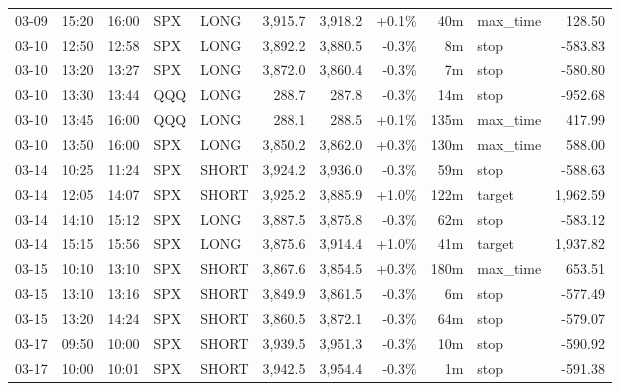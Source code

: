 \documentclass[11pt,a4paper,twoside]{article}
\begin{document}
\begin{center}
\begin{longtable}{>{\color{txtmain}}l l l l l r r r r >{\color{txtmain}}l r}
03-09 & 15:20 & 16:00 & SPX & LONG & 3,915.7 & 3,918.2 & \textcolor{wingreen}{+0.1\%} & 40m & max\_time & \textcolor{wingreen}{128.50} \\
03-10 & 12:50 & 12:58 & SPX & LONG & 3,892.2 & 3,880.5 & \textcolor{lossred}{-0.3\%} & 8m & stop & \textcolor{lossred}{-583.83} \\
03-10 & 13:20 & 13:27 & SPX & LONG & 3,872.0 & 3,860.4 & \textcolor{lossred}{-0.3\%} & 7m & stop & \textcolor{lossred}{-580.80} \\
03-10 & 13:30 & 13:44 & QQQ & LONG & 288.7 & 287.8 & \textcolor{lossred}{-0.3\%} & 14m & stop & \textcolor{lossred}{-952.68} \\
03-10 & 13:45 & 16:00 & QQQ & LONG & 288.1 & 288.5 & \textcolor{wingreen}{+0.1\%} & 135m & max\_time & \textcolor{wingreen}{417.99} \\
03-10 & 13:50 & 16:00 & SPX & LONG & 3,850.2 & 3,862.0 & \textcolor{wingreen}{+0.3\%} & 130m & max\_time & \textcolor{wingreen}{588.00} \\
03-14 & 10:25 & 11:24 & SPX & SHORT & 3,924.2 & 3,936.0 & \textcolor{lossred}{-0.3\%} & 59m & stop & \textcolor{lossred}{-588.63} \\
03-14 & 12:05 & 14:07 & SPX & SHORT & 3,925.2 & 3,885.9 & \textcolor{wingreen}{+1.0\%} & 122m & target & \textcolor{wingreen}{1,962.59} \\
03-14 & 14:10 & 15:12 & SPX & LONG & 3,887.5 & 3,875.8 & \textcolor{lossred}{-0.3\%} & 62m & stop & \textcolor{lossred}{-583.12} \\
03-14 & 15:15 & 15:56 & SPX & LONG & 3,875.6 & 3,914.4 & \textcolor{wingreen}{+1.0\%} & 41m & target & \textcolor{wingreen}{1,937.82} \\
03-15 & 10:10 & 13:10 & SPX & SHORT & 3,867.6 & 3,854.5 & \textcolor{wingreen}{+0.3\%} & 180m & max\_time & \textcolor{wingreen}{653.51} \\
03-15 & 13:10 & 13:16 & SPX & SHORT & 3,849.9 & 3,861.5 & \textcolor{lossred}{-0.3\%} & 6m & stop & \textcolor{lossred}{-577.49} \\
03-15 & 13:20 & 14:24 & SPX & SHORT & 3,860.5 & 3,872.1 & \textcolor{lossred}{-0.3\%} & 64m & stop & \textcolor{lossred}{-579.07} \\
03-17 & 09:50 & 10:00 & SPX & SHORT & 3,939.5 & 3,951.3 & \textcolor{lossred}{-0.3\%} & 10m & stop & \textcolor{lossred}{-590.92} \\
03-17 & 10:00 & 10:01 & SPX & SHORT & 3,942.5 & 3,954.4 & \textcolor{lossred}{-0.3\%} & 1m & stop & \textcolor{lossred}{-591.38} \\

\end{longtable}
\end{center}
\end{document}
